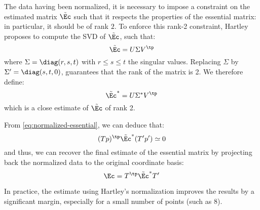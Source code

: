 The data having been normalized, it is necessary to impose a constraint on the estimated matrix $\tilde{\Ec}$ such that it respects the properties of the essential matrix: in particular, it should be of rank $2$. To enforce this rank-2 constraint, Hartley proposes to compute the SVD of $\tilde{\Ec}$, such that:
\begin{equation*}
    \tilde{\Ec} = U\Sigma V^\tp
\end{equation*}
where $\Sigma=\diag(r,s,t)$ with $r\leq s\leq t$ the singular values. Replacing $\Sigma$ by $\Sigma'=\diag(s,t,0)$, guarantees that the rank of the matrix is 2. We therefore define:
\begin{equation*}
    \tilde{\Ec}^* = U\Sigma^* V^\tp
\end{equation*}
which is a close estimate of $\tilde{\Ec}$ of rank 2.

From \autoref{eq:normalized-essential}, we can deduce that:
\begin{equation*}
    (Tp)^\tp\tilde{\Ec}^*(T'p')\simeq0
\end{equation*}
and thus, we can recover the final estimate of the essential matrix by projecting back the normalized data to the original coordinate basis:
\begin{equation*}
    \Ec = T^\tp\tilde{\Ec}^*T'
\end{equation*}

In practice, the estimate using Hartley's normalization improves the results by a significant margin, especially for a small number of points (such as 8).
